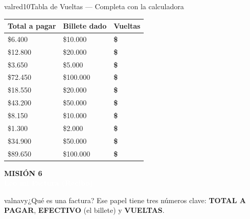 \documentclass[11pt]{article}
\newcommand{\boxfill}[1][3cm]{%
	\tcbox[on line,enhanced,size=minimal,
	colframe=valblue!40, colback=linetip,
	boxrule=1pt, arc=2mm,
	boxsep=4pt, left=4pt, right=4pt, top=4pt, bottom=4pt,
	drop shadow={opacity=0.10}]%
	{\makebox[#1]{\vphantom{Hg}}}}
\newcommand{\misionbanner}[4]{%
	\par\vspace{0.6cm}
	\begin{tcolorbox}[enhanced,
		colback=#1, colframe=#1,
		arc=0mm, boxrule=0pt,
		left=12pt, right=12pt, top=10pt, bottom=10pt,
		before skip=0pt, after skip=8pt,
		width=\linewidth+3.6cm, enlarge left by=-1.8cm]
		\begin{minipage}[c]{0.10\linewidth}
			\centering
			{\fontsize{30}{32}\selectfont\textcolor{white!60!#1}{#2}}
		\end{minipage}\hfill
		\begin{minipage}[c]{0.88\linewidth}
			\textcolor{white!50!#1}{\small\bfseries\MakeUppercase{Misión #3}}\\
			{\fontsize{18}{22}\selectfont\bfseries\textcolor{white}{#4}}
		\end{minipage}
\end{tcolorbox}}
\begin{document}
	\begin{actividad}{valred}{10}{Tabla de Vueltas --- Completa con la calculadora}
		\vspace{4pt}
		\renewcommand{\arraystretch}{1.6}
		\begin{center}
			\begin{tabular}{|m{3.5cm}|m{3.5cm}|m{4.5cm}|}
				\hline \rowcolor{valred!20} \textbf{Total a pagar} & \textbf{Billete dado} & \textbf{Vueltas} \\ \hline
				\$6.400  & \$10.000 & \textbf{\$}\;\boxfill[3cm] \\ \hline
				\$12.800 & \$20.000 & \textbf{\$}\;\boxfill[3cm] \\ \hline
				\$3.650  & \$5.000  & \textbf{\$}\;\boxfill[3cm] \\ \hline
				\$72.450 & \$100.000 & \textbf{\$}\;\boxfill[3cm] \\ \hline
				\$18.550 & \$20.000 & \textbf{\$}\;\boxfill[3cm] \\ \hline
				\$43.200 & \$50.000 & \textbf{\$}\;\boxfill[3cm] \\ \hline
				\$8.150  & \$10.000 & \textbf{\$}\;\boxfill[3cm] \\ \hline
				\$1.300  & \$2.000  & \textbf{\$}\;\boxfill[3cm] \\ \hline
				\$34.900 & \$50.000 & \textbf{\$}\;\boxfill[3cm] \\ \hline
				\$89.650 & \$100.000 & \textbf{\$}\;\boxfill[3cm] \\ \hline
			\end{tabular}
		\end{center}
	\end{actividad}
\newpage	
\misionbanner{valnavy}{\faReceipt}{6}{Leo mi Factura (Recibo)}

\begin{aprender}{valnavy}{¿Qué es una factura?}
	Ese papel tiene tres números clave: \textbf{TOTAL A PAGAR}, \textbf{EFECTIVO} (el billete) y \textbf{VUELTAS}.
\end{aprender}
\end{document}

